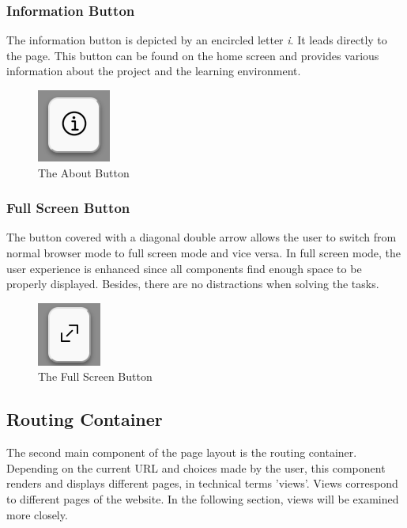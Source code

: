 \subsubsection{Information Button}
The information button is depicted by an encircled letter \textit{i}. It leads directly to the  page. This button can be found on the home screen and provides various information about the project and the learning environment.

\begin{figure}[h]
    \centering
    \includegraphics[width=0.15 \columnwidth]{figures/about.png}
    \caption{The About Button} 
    \label{fig:next} 
\end{figure}

\subsubsection{Full Screen Button}
The button covered with a diagonal double arrow allows the user to switch from normal browser mode to full screen mode and vice versa. In full screen mode, the user experience is enhanced since all components find enough space to be properly displayed. Besides, there are no distractions when solving the tasks.

\begin{figure}[h]
    \centering
    \includegraphics[width=0.15 \columnwidth]{figures/fullscreen.png}
    \caption{The Full Screen Button} 
    \label{fig:next} 
\end{figure}

\subsection{Routing Container}
The second main component of the page layout is the routing container. Depending on the current URL and choices made by the user, this component renders and displays different pages, in technical terms 'views'. Views correspond to different pages of the website. In the following section, views will be examined more closely. 

